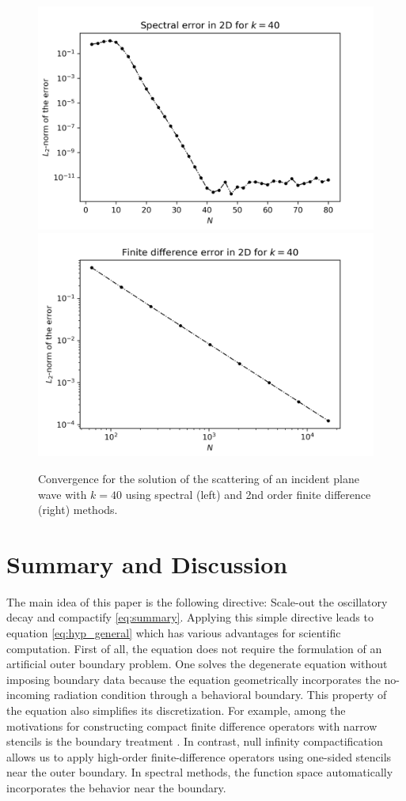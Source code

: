 \documentclass[final,onefignum,onetabnum]{siamart190516}
\begin{document}
\begin{figure}[tbhp]
	\centering
	\includegraphics[scale=0.41]{figs/spectral_2d.png}
	\includegraphics[scale=0.41]{figs/fd_2d.png}
	\caption{Convergence for the solution of the scattering of an incident plane wave with $k=40$ using spectral (left) and 2nd order finite difference (right) methods. }
	\label{fig:twod_scattering}
\end{figure}

\section{Summary and Discussion}
The main idea of this paper is the following directive: Scale-out the oscillatory decay and compactify \eqref{eq:summary}. Applying this simple directive leads to equation \eqref{eq:hyp_general} which has various advantages for scientific computation. First of all, the equation does not require the formulation of an artificial outer boundary problem. One solves the degenerate equation without imposing boundary data because the equation geometrically incorporates the no-incoming radiation condition through a behavioral boundary. This property of the equation also simplifies its discretization. For example, among the motivations for constructing compact finite difference operators with narrow stencils is the boundary treatment \cite{britt2010compact}. In contrast, null infinity compactification allows us to apply high-order finite-difference operators using one-sided stencils near the outer boundary. In spectral methods, the function space automatically incorporates the behavior near the boundary.
\end{document}
